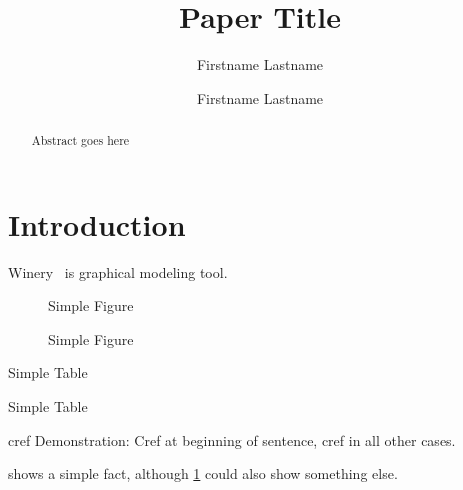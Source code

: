 \documentclass[runningheads,a4paper]{llncs}
\begin{document}


\title{Paper Title}

\author{Firstname Lastname \and Firstname Lastname}

%
\iffalse
\author{Firstname Lastname\inst{1} \and Firstname Lastname\inst{2} }

\institute{
Insitute 1\\
\email{...}\and
Insitute 2\\
\email{...}
}
\fi
			
\maketitle

\begin{abstract}
Abstract goes here
\end{abstract}


\section{Introduction}\label{sec:intro}
\blindtext

Winery~\cite{Winery} is graphical modeling tool.

\begin{figure}
Simple Figure
\caption{Simple Figure}
\label{fig:simple}
\end{figure}

\begin{table}
\caption{Simple Table}

\label{tab:simple}
Simple Table
\end{table}

cref Demonstration: Cref at beginning of sentence, cref in all other cases.

 shows a simple fact, although \cref{fig:simple} could also show something else.
\end{document}
